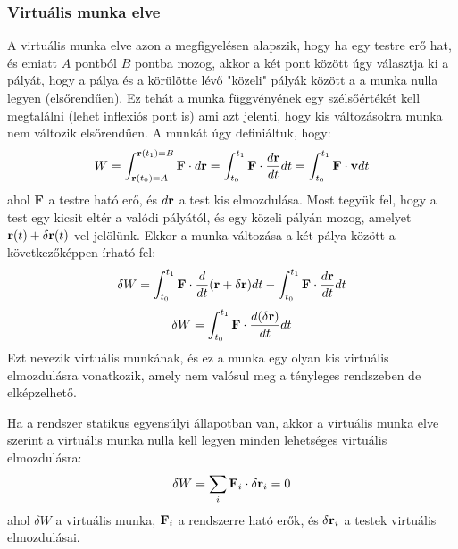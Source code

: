 \documentclass[a4paper,12pt]{article}
\begin{document}
\subsubsection{Virtuális munka elve}
A virtuális munka elve azon a megfigyelésen alapszik, hogy ha egy testre erő hat, és emiatt $A$ pontból $B$ pontba mozog, akkor a két pont között úgy választja ki a pályát, hogy a pálya és a körülötte lévő "közeli" pályák között a a munka nulla legyen (elsőrendűen).
Ez tehát a munka függvényének egy szélsőértékét kell megtalálni  (lehet inflexiós pont is) ami azt jelenti, hogy kis változásokra munka nem változik elsőrendűen. A munkát úgy definiáltuk, hogy:
\begin{equation}
    W = \int_{\bold{r}(t_0) = A}^{\bold{r}(t_1) = B} \bold{F} \cdot d\bold{r} = \int_{t_0}^{t_1} \bold{F} \cdot \frac{d\bold{r}}{dt} dt = \int_{t_0}^{t_1} \bold{F} \cdot \bold{v} dt
\end{equation}
ahol $\bold{F}$ a testre ható erő, és $d\bold{r}$ a test kis elmozdulása. Most tegyük fel, hogy a test egy kicsit eltér a valódi pályától, és egy közeli pályán mozog, amelyet $\bold{r}(t) + \delta \bold{r}(t)$-vel jelölünk.
Ekkor a munka változása a két pálya között a következőképpen írható fel:
\begin{equation}
    \delta W = \int_{t_0}^{t_1} \bold{F} \cdot \frac{d}{dt} (\bold{r} + \delta \bold{r}) dt - \int_{t_0}^{t_1} \bold{F} \cdot \frac{d\bold{r}}{dt} dt
\end{equation}
\begin{equation}
    \delta W = \int_{t_0}^{t_1} \bold{F} \cdot \frac{d (\delta \bold{r})}{dt} dt
\end{equation}
Ezt nevezik virtuális munkának, és ez a munka egy olyan kis virtuális elmozdulásra vonatkozik, amely nem valósul meg a tényleges rendszeben de elképzelhető.

Ha a rendszer statikus egyensúlyi állapotban van, akkor a virtuális munka elve szerint a virtuális munka nulla kell legyen minden lehetséges virtuális elmozdulásra:
\begin{equation}
    \delta W = \sum_i \bold{F}_i \cdot \delta \bold{r}_i = 0
\end{equation}
ahol $\delta W$ a virtuális munka, $\bold{F}_i$ a rendszerre ható erők, és $\delta \bold{r}_i$ a testek virtuális elmozdulásai. 
\end{document}
